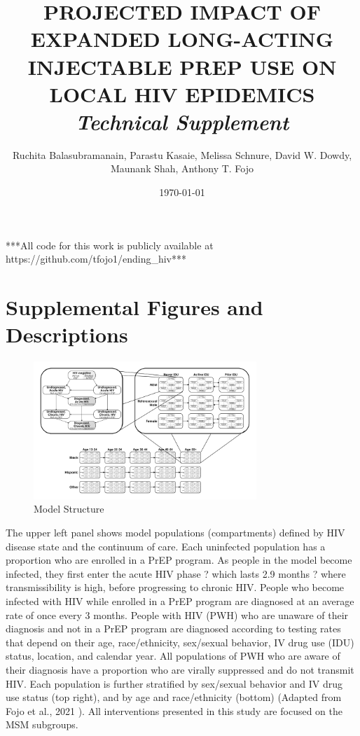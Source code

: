 \documentclass{article}
\begin{document}
	
\setcounter{tocdepth}{4} 
\setcounter{secnumdepth}{4}	
	
\title{PROJECTED IMPACT OF EXPANDED LONG-ACTING INJECTABLE PREP USE ON LOCAL HIV EPIDEMICS \\
	\textit{Technical Supplement}}
\date{\today}
\author{Ruchita Balasubramanain, Parastu Kasaie, Melissa Schnure, David W. Dowdy, Maunank Shah, Anthony T. Fojo}

\maketitle
{}

\setcounter{tocdepth}{2}
\tableofcontents

\vfill
***All code for this work is publicly available at https://github.com/tfojo1/ending\_hiv***
\pagebreak





\section{Supplemental Figures and Descriptions}

\begin{figure}[H]
	\centering
	\caption{Model Structure}
	\includegraphics[width=0.75\textwidth]{images/FigureS1}
\end{figure}
The upper left panel shows model populations (compartments) defined by HIV disease state and the continuum of care. Each uninfected population has a proportion who are enrolled in a PrEP program. As people in the model become infected, they first enter the acute HIV phase ? which lasts 2.9 months ? where transmissibility is high, before progressing to chronic HIV. People who become infected with HIV while enrolled in a PrEP program are diagnosed at an average rate of once every 3 months. People with HIV (PWH) who are unaware of their diagnosis and not in a PrEP program are diagnosed according to testing rates that depend on their age, race/ethnicity, sex/sexual behavior, IV drug use (IDU) status, location, and calendar year. All populations of PWH who are aware of their diagnosis have a proportion who are virally suppressed and do not transmit HIV. Each population is further stratified by sex/sexual behavior and IV drug use status (top right), and by age and race/ethnicity (bottom) (Adapted from Fojo et al., 2021 \cite{fojo2021}). All interventions presented in this study are focused on the MSM subgroups. 
\end{document}

